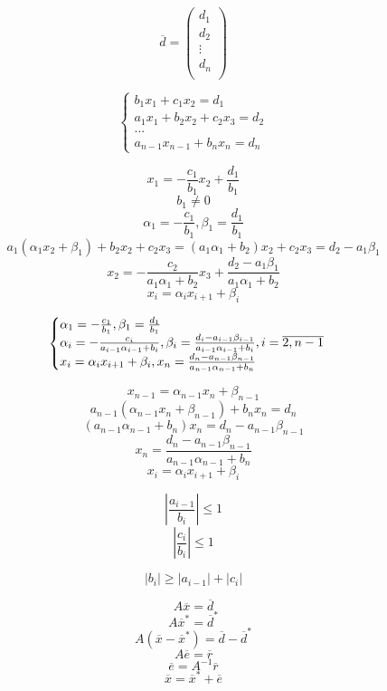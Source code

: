 \documentclass [12pt]{article}
\begin{document}
$$\overline{d} = \left(\begin{array}{c}
d_1 \\
d_2 \\
\vdots \\
d_n \\
\end{array}\right)$$

\begin{equation*}
\begin{cases}
b_1x_1+c_1x_2=d_1\\
a_1x_1+b_2x_2+c_2x_3=d_2 \\
... \\
a_{n-1}x_{n-1}+b_nx_n=d_n
\end{cases}
\end{equation*}

$$ x_1= -\frac{c_1}{b_1}x_2 + \frac{d_1}{b_1} $$
$$ b_1 \neq 0 $$
$$ \alpha_1=-\frac{c_1}{b_1}, \beta_1=\frac{d_1}{b_1} $$
$$ a_1(\alpha_1x_2 + \beta_1) + b_2x_2 + c_2x_3 = (a_1\alpha_1 + b_2)x_2 + c_2x_3 = d_2 - a_1\beta_1 $$
$$ x_2= -\frac{c_2}{a_1\alpha_1 + b_2}x_3 + \frac{d_2 - a_1\beta_1}{a_1\alpha_1 + b_2 }$$
$$ x_i=\alpha_ix_{i + 1}+\beta_i $$

\begin{equation*}
\begin{cases}
$$ \alpha_1=-\frac{c_1}{b_1}, \beta_1=\frac{d_1}{b_1}  $$\\
$$ \alpha_i=-\frac{c_i}{a_{i - 1}\alpha_{i - 1} + b_i}, \beta_i=\frac{d_i - a_{i - 1}\beta_{i - 1}}{a_{i - 1}\alpha_{i - 1} + b_i}, i=\overline{2, n - 1} $$\\
$$x_i=\alpha_ix_{i + 1}+\beta_i, x_n = \frac{d_n - a_{n - 1}\beta_{n - 1}}{a_{n - 1}\alpha_{n - 1} + b_n} $$
\end{cases}
\end{equation*}

$$ x_{n - 1} = \alpha_{n - 1}x_n+\beta_{n - 1} $$
$$ a_{n - 1}(\alpha_{n - 1}x_n + \beta_{n - 1}) + b_nx_n = d_n $$
$$ (a_{n - 1}\alpha_{n - 1} + b_n)x_n = d_n - a_{n - 1}\beta_{n - 1} $$
$$ x_n = \frac{d_n - a_{n - 1}\beta_{n - 1}}{a_{n - 1}\alpha_{n - 1} + b_n} $$
$$ x_i=\alpha_ix_{i + 1}+\beta_i $$

$$\left|\frac{a_{i - 1}}{b_i}\right| \leq 1$$
$$\left|\frac{c_i}{b_i}\right| \leq 1$$

$$\left|b_i\right| \geq \left|a_{i - 1}\right| + \left|c_i\right|$$

$$ A\overline{x} = \overline{d} $$
$$ A\overline{x}^* = \overline{d}^* $$
$$ A(\overline{x}-\overline{x}^*) = \overline{d}-\overline{d}^* $$
$$ A\overline{e} = \overline{r} $$
$$ \overline{e} = A^{-1} \overline{r} $$
$$ \overline{x} = \overline{x}^* + \overline{e} $$
\end{document}
